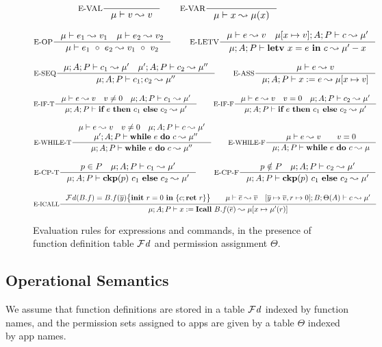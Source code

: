 \begin{figure*}[ht]
{\scriptsize
\[
\inference[E-VAL]{}{\mu \vdash \leVAL{v}  \leadsto v}
\qquad
\inference[E-VAR]{}{\mu \vdash \leVAR{x}  \leadsto \mu(x)}
\]

\[
\inference[E-OP]{\mu \vdash e_1 \leadsto v_1\quad \mu \vdash e_2 \leadsto v_2}
{\mu \vdash \leOP{e_1}{e_2} \leadsto \leOP{v_1}{v_2}}
\qquad
\inference[E-LETV]{\mu \vdash e \leadsto v \quad \mu [ x \mapsto v ]; A ; P \vdash c \leadsto \mu'}
{\mu; A; P \vdash \lcLETV{x}{e}{c} \leadsto \mu' - x}
\]

\[
\inference[E-SEQ]{\mu;A; P \vdash c_1 \leadsto \mu' \quad \mu';A; P \vdash c_2 \leadsto \mu''}
{\mu;A;P \vdash \lcSEQ{c_1}{c_2} \leadsto \mu''}
\qquad
\inference[E-ASS]{\mu \vdash e \leadsto v}
{\mu; A; P \vdash \lcASS{x}{e} \leadsto \mu [ x \mapsto v ]}
\]

\[
\inference[E-IF-T]{\mu \vdash e \leadsto v\quad v\neq 0\quad \mu; A; P \vdash c_1 \leadsto \mu'}
{\mu; A; P \vdash \lcIF{e}{c_1}{c_2} \leadsto \mu'}
\qquad
\inference[E-IF-F]{\mu \vdash e \leadsto v\quad v = 0\quad \mu;A; P \vdash c_2 \leadsto \mu'}
{\mu;A; P \vdash \lcIF{e}{c_1}{c_2} \leadsto \mu'}
\]

\[
\inference[E-WHILE-T]{
\mu \vdash e \leadsto v\quad v\neq 0\quad
\mu;A; P \vdash c \leadsto \mu'\\
\quad \mu' ; A ; P \vdash \lcWHILE{e}{c} \leadsto \mu''
}
{\mu;A; P \vdash \lcWHILE{e}{c} \leadsto \mu''}
\qquad
\inference[E-WHILE-F]{\mu \vdash e \leadsto v\qquad v = 0}
{\mu;A; P \vdash \lcWHILE{e}{c} \leadsto \mu}
\]

\[
\inference[E-CP-T]{p\in P \quad \mu; A; P \vdash c_1 \leadsto \mu'}
{\mu; A ; P \vdash \lcCP{p}{c_1}{c_2} \leadsto \mu'}
\qquad
\inference[E-CP-F]{p\notin P \quad \mu;A;P \vdash c_2 \leadsto \mu'}
{\mu;A;P \vdash \lcCP{p}{c_1}{c_2} \leadsto \mu'}
\]

\[
\inference[E-ICALL]{
\FD(B.f) = \lpPROG{B.f}{\overline{y}}{c}{\lpRES} \qquad
\mu\vdash\overline{e} \leadsto \overline{v} \quad
[\overline{y} \mapsto \overline{v}, r \mapsto 0] ; B; \Theta(A) \vdash c \leadsto \mu'}
{\mu;A;P \vdash \lcCALL{x}{B.f}{\overline{e}} \leadsto \mu[x \mapsto \mu'(r) ]}
\]
}
\caption{Evaluation rules for expressions and commands, in the presence of function definition table $\mathcal{F}\mathit{d}$ and permission assignment $\Theta.$
}
\label{fig:semantics}
\end{figure*}
 
\subsection{Operational Semantics}\label{sec:semantics}
We assume that function definitions are stored in a table $\mathcal{F}\mathit{d}$ indexed by function names, and the permission sets assigned to apps are given by a table $\Theta$ indexed by app names.

